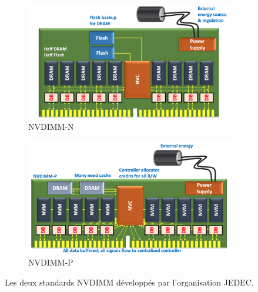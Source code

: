             \begin{figure}[t!]
                \centering
                \begin{subfigure}[t]{0.50\textwidth}
                    \centering
                    \includegraphics[width=\linewidth]{images/edl_nvdimm_n.png}
                    \caption{\label{fig:edl_nvdimm_n} NVDIMM-N}
                \end{subfigure}\hfill
                \begin{subfigure}[t]{0.50\textwidth}
                    \centering
                    \includegraphics[width=\linewidth]{images/edl_nvdimm_p.png}
                    \caption{\label{fig:edl_nvdimm_p}NVDIMM-P}
                \end{subfigure}
                \caption{\label{fig:edl_nvdimm}Les deux standards NVDIMM développés par l'organisation JEDEC\protect\footnotemark.}
            \end{figure}
        

